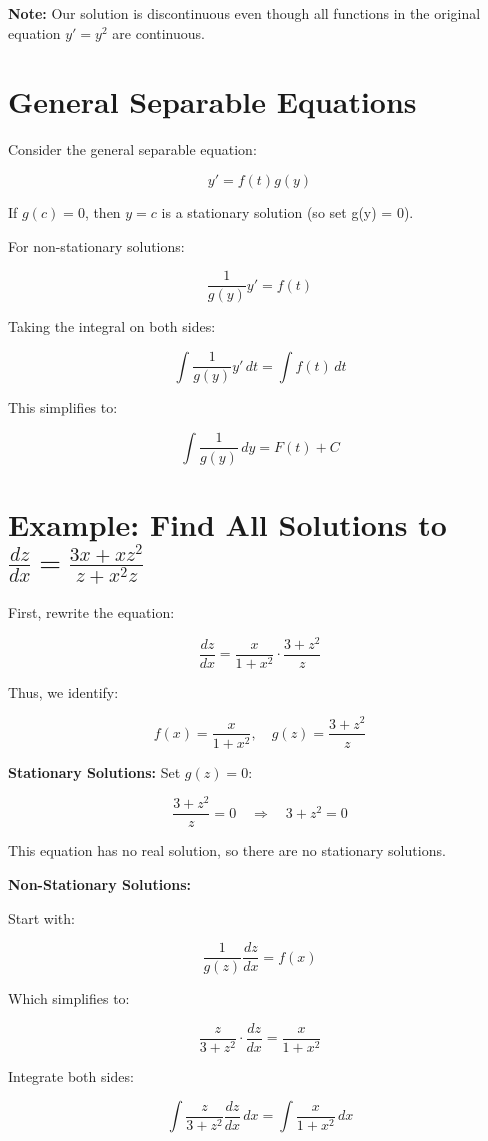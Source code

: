 \documentclass{article}
\begin{document}
\textbf{Note:} Our solution is discontinuous even though all functions in the original equation \( y' = y^2 \) are continuous.

\section*{General Separable Equations}

Consider the general separable equation:

\[
y' = f(t)g(y)
\]

If \( g(c) = 0 \), then \( y = c \) is a stationary solution (so set g(y) = 0).

For non-stationary solutions:

\[
\frac{1}{g(y)} y' = f(t)
\]

Taking the integral on both sides:

\[
\int \frac{1}{g(y)} y' \, dt = \int f(t) \, dt
\]

This simplifies to:

\[
\int \frac{1}{g(y)} \, dy = F(t) + C
\]

\section*{Example: Find All Solutions to \( \frac{dz}{dx} = \frac{3x + xz^2}{z + x^2z} \)}

First, rewrite the equation:

\[
\frac{dz}{dx} = \frac{x}{1 + x^2} \cdot \frac{3 + z^2}{z}
\]

Thus, we identify:

\[
f(x) = \frac{x}{1 + x^2}, \quad g(z) = \frac{3 + z^2}{z}
\]

\textbf{Stationary Solutions:}  
Set \( g(z) = 0 \):

\[
\frac{3 + z^2}{z} = 0 \quad \Rightarrow \quad 3 + z^2 = 0
\]

This equation has no real solution, so there are no stationary solutions.

\textbf{Non-Stationary Solutions:}

Start with:

\[
\frac{1}{g(z)} \frac{dz}{dx} = f(x)
\]

Which simplifies to:

\[
\frac{z}{3 + z^2} \cdot \frac{dz}{dx} = \frac{x}{1 + x^2}
\]

Integrate both sides:

\[
\int \frac{z}{3 + z^2} \frac{dz}{dx} \, dx = \int \frac{x}{1 + x^2} \, dx
\]
\end{document}
